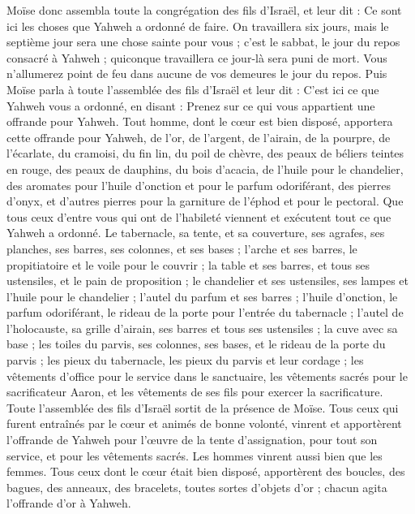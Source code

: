 \begin{multicols}{2}
\VerseOne{}Moïse donc assembla toute la congrégation des fils d'Israël, et leur dit : Ce sont ici les choses que Yahweh a ordonné de faire.
On travaillera six jours, mais le septième jour sera une chose sainte pour vous ; c'est le sabbat, le jour du repos consacré à Yahweh ; quiconque travaillera ce jour-là sera puni de mort.
Vous n'allumerez point de feu dans aucune de vos demeures le jour du repos.
Puis Moïse parla à toute l'assemblée des fils d'Israël et leur dit : C'est ici ce que Yahweh vous a ordonné, en disant :
Prenez sur ce qui vous appartient une offrande pour Yahweh. Tout homme, dont le cœur est bien disposé, apportera cette offrande pour Yahweh, de l'or, de l'argent, de l'airain,
de la pourpre, de l'écarlate, du cramoisi, du fin lin, du poil de chèvre,
des peaux de béliers teintes en rouge, des peaux de dauphins, du bois d’acacia,
de l'huile pour le chandelier, des aromates pour l'huile d'onction et pour le parfum odoriférant,
des pierres d'onyx, et d’autres pierres pour la garniture de l'éphod et pour le pectoral.
Que tous ceux d’entre vous qui ont de l’habileté viennent et exécutent tout ce que Yahweh a ordonné.
Le tabernacle, sa tente, et sa couverture, ses agrafes, ses planches, ses barres, ses colonnes, et ses bases ;
l'arche et ses barres, le propitiatoire et le voile pour le couvrir ;
la table et ses barres, et tous ses ustensiles, et le pain de proposition ;
le chandelier et ses ustensiles, ses lampes et l'huile pour le chandelier ;
l'autel du parfum et ses barres ; l'huile d'onction, le parfum odoriférant, le rideau de la porte pour l'entrée du tabernacle ;
l'autel de l'holocauste, sa grille d'airain, ses barres et tous ses ustensiles ; la cuve avec sa base ;
les toiles du parvis, ses colonnes, ses bases, et le rideau de la porte du parvis ;
les pieux du tabernacle, les pieux du parvis et leur cordage ;
les vêtements d’office pour le service dans le sanctuaire, les vêtements sacrés pour le sacrificateur Aaron, et les vêtements de ses fils pour exercer la sacrificature.
Toute l'assemblée des fils d'Israël sortit de la présence de Moïse.
Tous ceux qui furent entraînés par le cœur et animés de bonne volonté, vinrent et apportèrent l'offrande de Yahweh pour l’œuvre de la tente d'assignation, pour tout son service, et pour les vêtements sacrés.
Les hommes vinrent aussi bien que les femmes. Tous ceux dont le cœur était bien disposé, apportèrent des boucles, des bagues, des anneaux, des bracelets, toutes sortes d’objets d'or ; chacun agita l’offrande d'or à Yahweh.

\end{multicols}
